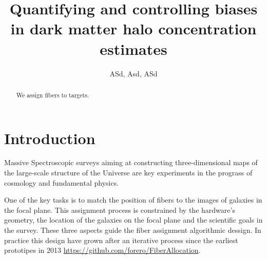 \documentclass{aastex}
\begin{document}
\title{Quantifying and controlling biases in dark matter halo concentration estimates}
\author{
  ASd, Asd, ASd
}




\begin{abstract}
We assign fibers to targets.
\end{abstract}



\section{Introduction}
\label{sec:introduction}

Massive Spectroscopic surveys aiming at constructing three-dimensional
maps of the large-scale structure of the Universe are key experiments
in the prograss of cosmology and fundamental physics.

One of the key tasks is to match the position of fibers to the images
of galaxies in the focal plane. This assignment process is constrained
by the hardware's geometry, the location of the galaxies on the focal
plane and the scientific goals in the survey. 
These three aspects guide the fiber assignment algorithmic dessign.
In practice this design have grown after an iterative process since
the earliest prototipes in 2013
\url{https://github.com/forero/FiberAllocation}.   

\cite{2014SPIE.9150E..23S}
\cite{2016A&C....15....1N}


\end{document}
